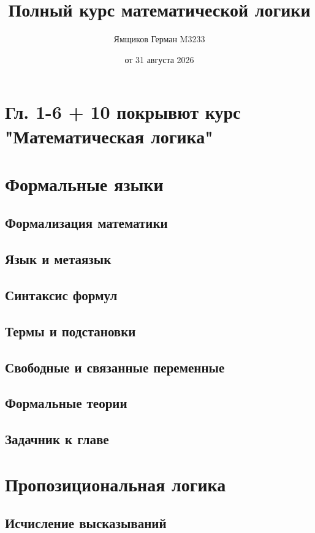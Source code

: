 \documentclass[12pt,a4paper,oneside,openany]{book}
\title{\sffamily\bfseries\color{logicblue}Полный курс математической логики}
\author{Ямщиков Герман M3233}
\date{от 31 августа 2026}
\theoremstyle{definition}
\theoremstyle{plain}
\theoremstyle{remark}
\begin{document}
\maketitle
\tableofcontents
\chapter*{Гл. 1-6 + 10 покрывют курс  "Математическая логика"}

\chapter{Формальные языки}

\section{Формализация математики}
\section{Язык и метаязык}
\section{Синтаксис формул}
\section{Термы и подстановки}
\section{Свободные и связанные переменные}
\section{Формальные теории}

\section{Задачник к главе}

\chapter{Пропозициональная логика}

\section{Исчисление высказываний}
\end{document}
